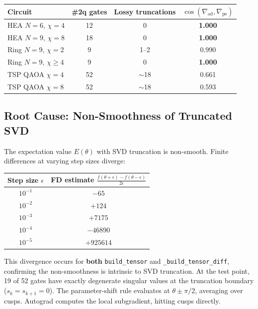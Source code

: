 \documentclass[11pt]{article}
\begin{document}
\begin{center}
\begin{tabular}{lccc}
\toprule
Circuit & \#2q gates & Lossy truncations & $\cos(\nabla_{\mathrm{ad}}, \nabla_{\mathrm{ps}})$ \\
\midrule
HEA $N{=}6$, $\chi{=}4$ & 12 & 0 & \textbf{1.000} \\
HEA $N{=}9$, $\chi{=}8$ & 18 & 0 & \textbf{1.000} \\
Ring $N{=}9$, $\chi{=}2$ & 9 & 1--2 & 0.990 \\
Ring $N{=}9$, $\chi{\geq}4$ & 9 & 0 & \textbf{1.000} \\
TSP QAOA $\chi{=}4$ & 52 & $\sim$18 & 0.661 \\
TSP QAOA $\chi{=}8$ & 52 & $\sim$18 & 0.593 \\
\bottomrule
\end{tabular}
\end{center}

\subsection{Root Cause: Non-Smoothness of Truncated SVD}

The expectation value $E(\theta)$ with SVD truncation is non-smooth. Finite differences at varying step sizes diverge:

\begin{center}
\begin{tabular}{cc}
\toprule
Step size $\epsilon$ & FD estimate $\frac{f(\theta+\epsilon) - f(\theta-\epsilon)}{2\epsilon}$ \\
\midrule
$10^{-1}$ & $-65$ \\
$10^{-2}$ & $+124$ \\
$10^{-3}$ & $+7175$ \\
$10^{-4}$ & $-46890$ \\
$10^{-5}$ & $+925614$ \\
\bottomrule
\end{tabular}
\end{center}

This divergence occurs for \textbf{both} \texttt{build\_tensor} and \texttt{\_build\_tensor\_diff}, confirming the non-smoothness is intrinsic to SVD truncation. At the test point, 19 of 52 gates have exactly degenerate singular values at the truncation boundary ($s_k = s_{k+1} = 0$). The parameter-shift rule evaluates at $\theta \pm \pi/2$, averaging over cusps. Autograd computes the local subgradient, hitting cusps directly.
\end{document}

